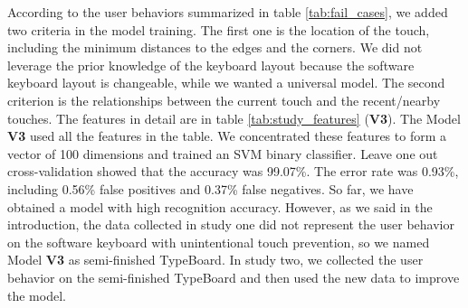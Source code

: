 According to the user behaviors summarized in table \ref{tab:fail_cases}, we added two criteria in the model training. The first one is the location of the touch, including the minimum distances to the edges and the corners. We did not leverage the prior knowledge of the keyboard layout because the software keyboard layout is changeable, while we wanted a universal model. The second criterion is the relationships between the current touch and the recent/nearby touches. The features in detail are in table \ref{tab:study_features} (\textbf{V3}). The Model \textbf{V3} used all the features in the table. We concentrated these features to form a vector of 100 dimensions and trained an SVM binary classifier. Leave one out cross-validation showed that the accuracy was 99.07\%. The error rate was 0.93\%, including 0.56\% false positives and 0.37\% false negatives. So far, we have obtained a model with high recognition accuracy. However, as we said in the introduction, the data collected in study one did not represent the user behavior on the software keyboard with unintentional touch prevention, so we named Model \textbf{V3} as semi-finished TypeBoard. In study two, we collected the user behavior on the semi-finished TypeBoard and then used the new data to improve the model.



